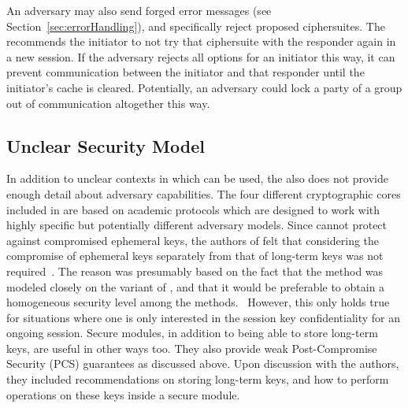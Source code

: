 \documentclass[runningheads]{llncs}
\begin{document}
An adversary may also send forged error messages (see
Section~\ref{sec:errorHandling}), and specifically reject proposed ciphersuites.
%
The \mEdhoc{} \mSpec{} recommends the initiator to not try that ciphersuite with
the responder again in a new session.
%
If the adversary rejects all options for an initiator this way, it can prevent
communication between the initiator and that responder until the initiator's
cache is cleared.
%
Potentially, an adversary could lock a party of a group out of communication
altogether this way.
%

\subsection{Unclear Security Model}
In addition to unclear contexts in which
\mEdhoc{} can be used, the \mSpec{} also does not provide enough detail about
adversary capabilities.
%
The four different cryptographic cores included in \mEdhoc{} are based on
academic protocols which are designed to work with highly specific but
potentially different adversary models.
%
Since \mSigma{} cannot protect against compromised ephemeral keys, the authors
of \mEdhoc{} felt that considering the compromise of ephemeral keys separately
from that of long-term keys was not required~\cite{personalCommunication}.
%
The reason was presumably based on the fact that the \mSigSig{} method was
modeled closely on the \mSigmaI{} variant of \mSigma{}, and that it would be
preferable to obtain a homogeneous security level among the \mEdhoc{}
methods.~\cite{Norr21}
%
However, this only holds true for situations where one is only interested in the
session key confidentiality for an ongoing session.
%
Secure modules, in addition to being able to store long-term keys, are useful in
other ways too.
%
They also provide weak Post-Compromise Security (PCS) guarantees as discussed
above.
%
Upon discussion with the authors, they included recommendations on storing
long-term keys, and how to perform operations on these keys inside a secure
module.
%

\end{document}
